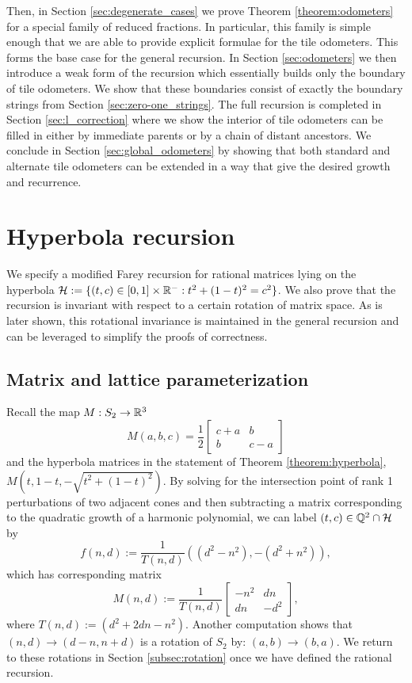 \documentclass[12pt]{amsart}
\begin{document}
Then, in Section \ref{sec:degenerate_cases} we prove Theorem \ref{theorem:odometers} for a special family of reduced fractions. 
In particular, this family is simple enough that we are able to provide explicit formulae for the tile odometers. 
This forms the base case for the general recursion. 
In Section \ref{sec:odometers} we then introduce a weak form of the recursion which essentially builds only the boundary of tile odometers. We show that these boundaries consist of exactly the boundary strings from Section \ref{sec:zero-one_strings}. The full recursion is completed
in Section \ref{sec:l_correction} where we show the interior of tile odometers can be filled in either by immediate parents or by a chain of distant ancestors.  We conclude in Section \ref{sec:global_odometers} by showing that both standard and alternate tile odometers can be extended in a way that give the desired growth and recurrence. 
 

\section{Hyperbola recursion} \label{sec:hyperbola}
We specify a modified Farey recursion for rational matrices lying on the hyperbola $\mathcal{H} := \{(t,c) \in [0,1] \times \mathbb{R}^-: t^2 + (1-t)^2 = c^2\}$. We also prove that the recursion is invariant with respect to a certain rotation of matrix space. As is later shown, this rotational invariance is maintained in the general recursion and can be leveraged to simplify the proofs of correctness. 

\subsection{Matrix and lattice parameterization} \label{subsec:matrix_param}
Recall the map $M:S_2 \to \mathbb{R}^3$ 
\begin{equation} \label{eq:matrix_param}
M(a,b,c) = \frac{1}{2} \begin{bmatrix} c + a & b \\
b & c-a 
\end{bmatrix}
\end{equation}
and the hyperbola matrices in the statement of Theorem \ref{theorem:hyperbola}, $M(t, 1-t, -\sqrt{t^2 + (1-t)^2})$. 
By solving for the intersection point of rank 1 perturbations of two adjacent cones and then subtracting a matrix corresponding to the quadratic growth of a harmonic polynomial, we can label $(t,c) \in \mathbb{Q}^2 \cap \mathcal{H}$ by 
\begin{equation} \label{eq:hyperbola_param}
f(n,d) := \frac{1}{T(n,d)} ((d^2-n^2), -(d^2+n^2)),
\end{equation}
which has corresponding matrix 
\[
M(n,d) := \frac{1}{T(n,d)} \begin{bmatrix} -n^2 & d n \\ d n & -d^2 \end{bmatrix}, 
\]
where $T(n,d) := (d^2 + 2 d n - n^2)$. Another computation shows that $(n,d) \to(d-n,n+d)$ is a rotation of $S_2$ by: $(a,b) \to (b,a)$. We return to these rotations in Section \ref{subsec:rotation} once we have defined the rational recursion.
\end{document}
